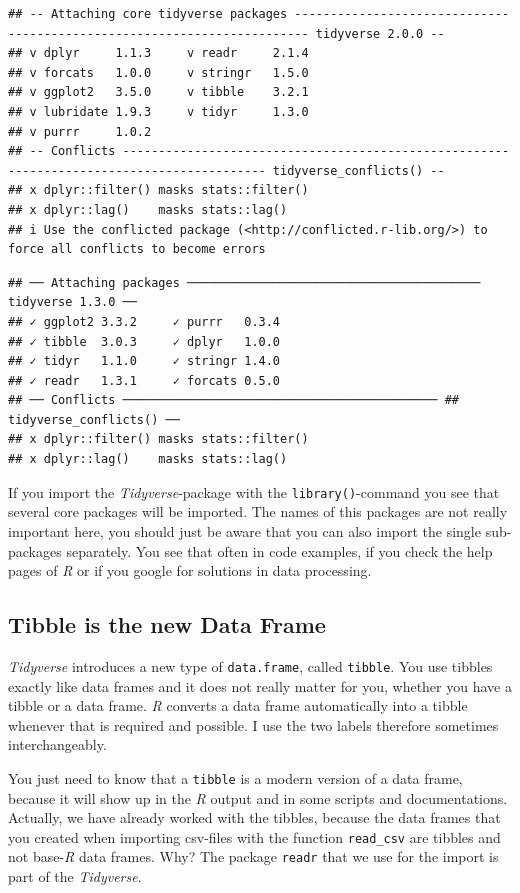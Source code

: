 \documentclass[
]{scrartcl}
\begin{document}
\begin{verbatim}
## -- Attaching core tidyverse packages ------------------------------------------------------------------------ tidyverse 2.0.0 --
## v dplyr     1.1.3     v readr     2.1.4
## v forcats   1.0.0     v stringr   1.5.0
## v ggplot2   3.5.0     v tibble    3.2.1
## v lubridate 1.9.3     v tidyr     1.3.0
## v purrr     1.0.2     
## -- Conflicts ------------------------------------------------------------------------------------------ tidyverse_conflicts() --
## x dplyr::filter() masks stats::filter()
## x dplyr::lag()    masks stats::lag()
## i Use the conflicted package (<http://conflicted.r-lib.org/>) to force all conflicts to become errors
\end{verbatim}

\begin{verbatim}
## ── Attaching packages ───────────────────────────────────────── tidyverse 1.3.0 ──
## ✓ ggplot2 3.3.2     ✓ purrr   0.3.4
## ✓ tibble  3.0.3     ✓ dplyr   1.0.0
## ✓ tidyr   1.1.0     ✓ stringr 1.4.0
## ✓ readr   1.3.1     ✓ forcats 0.5.0
## ── Conflicts ──────────────────────────────────────────── ## tidyverse_conflicts() ──
## x dplyr::filter() masks stats::filter()
## x dplyr::lag()    masks stats::lag()
\end{verbatim}

If you import the \emph{Tidyverse}-package with the \texttt{library()}-command you see that several core packages will be imported. The names of this packages are not really important here, you should just be aware that you can also import the single sub-packages separately. You see that often in code examples, if you check the help pages of \emph{R} or if you google for solutions in data processing.

\hypertarget{tibble-is-the-new-data-frame}{%
\subsection{Tibble is the new Data Frame}\label{tibble-is-the-new-data-frame}}

\emph{Tidyverse} introduces a new type of \texttt{data.frame}, called \texttt{tibble}. You use tibbles exactly like data frames and it does not really matter for you, whether you have a tibble or a data frame. \emph{R} converts a data frame automatically into a tibble whenever that is required and possible. I use the two labels therefore sometimes interchangeably.

You just need to know that a \texttt{tibble} is a modern version of a data frame, because it will show up in the \emph{R} output and in some scripts and documentations. Actually, we have already worked with the tibbles, because the data frames that you created when importing csv-files with the function \texttt{read\_csv} are tibbles and not base-\emph{R} data frames. Why? The package \texttt{readr} that we use for the import is part of the \emph{Tidyverse}.
\end{document}
